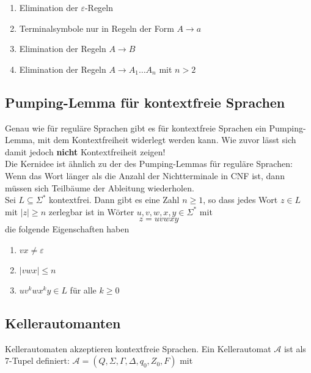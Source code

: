 \documentclass[11pt]{scrartcl}
\begin{document}
\begin{enumerate}
	\item Elimination der $\varepsilon$-Regeln
    \item Terminalsymbole nur in Regeln der Form $A \to a$
    \item Elimination der Regeln $A \to B$
    \item Elimination der Regeln $A \to A_1 \ldots A_n$ mit $n > 2$
\end{enumerate}

\subsection{Pumping-Lemma für kontextfreie Sprachen}

Genau wie für reguläre Sprachen gibt es für kontextfreie Sprachen ein Pumping-Lemma, mit dem Kontextfreiheit widerlegt werden kann. Wie zuvor lässt sich damit jedoch \textbf{nicht} Kontextfreiheit zeigen! \\

Die Kernidee ist ähnlich zu der des Pumping-Lemmas für reguläre Sprachen: Wenn das Wort länger als die Anzahl der Nichtterminale in CNF ist, dann müssen sich Teilbäume der Ableitung wiederholen. \\

Sei $L \subseteq \Sigma^\ast$ kontextfrei. Dann gibt es eine Zahl $n \geq 1$, so dass jedes Wort $z \in L$ mit $|z| \geq n$ zerlegbar ist in Wörter $u, v, w, x, y \in \Sigma^\ast$ mit $$z = uvwxy$$
die folgende Eigenschaften haben
\begin{enumerate}
	\item $vx \neq \varepsilon$
    \item $|vwx| \leq n$
    \item $uv^kwx^ky \in L$ für alle $k \geq 0$
\end{enumerate}

\subsection{Kellerautomanten}
Kellerautomaten akzeptieren kontextfreie Sprachen. Ein Kellerautomat $\mathcal{A}$ ist als 7-Tupel definiert:
$\mathcal{A} = (Q, \Sigma, \Gamma, \Delta, q_0, Z_0, F)$ mit
\end{document}

